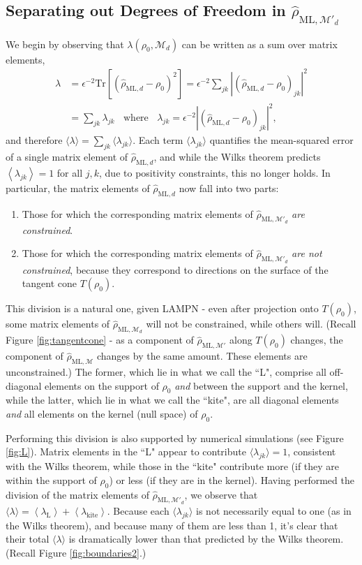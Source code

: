 \documentclass[aps,pra, twocolumn]{revtex4-1}
\newcommand{\M}{\mathcal{M}}
\newcommand{\expect}[1]{\ensuremath{\left\langle#1\right\rangle}}
\newcommand{\rhohat}{\hat{\rho}}
\newcommand{\rhoML}[1]{\rhohat_{\scriptscriptstyle{\mathrm{ML},#1}}}
\begin{document}
\subsection{Separating out Degrees of Freedom in $\rhoML{\M'_{d}}$}
\label{subsec:dof}
We begin by observing that $\lambda(\rho_{0}, \M_{d})$ can be written as a sum over matrix elements,
\begin{align}
\label{eq:llrserrors}
\nonumber \lambda &=\epsilon^{-2}\mathrm{Tr}[(\rhoML{d} - \rho_{0})^{2}] = \epsilon^{-2}\sum_{jk}|(\rhoML{d}- \rho_{0} )_{jk}|^{2}\\
&= \sum_{jk}\lambda_{jk}~~~~\text{where}~~~~\lambda_{jk} = \epsilon^{-2}|(\rhoML{d} - \rho_{0} )_{jk} |^{2},
\end{align}
and therefore $\langle \lambda \rangle = \sum_{jk}\langle\lambda_{jk}\rangle$.  Each term $\langle \lambda_{jk}\rangle$ quantifies the mean-squared error of a single matrix element of $\rhoML{d}$, and while the Wilks theorem predicts $\expect{\lambda_{jk}}=1$ for all $j,k$, due to positivity constraints, this no longer holds. In particular, the matrix elements of $\rhoML{d}$ now fall into two parts:

\begin{enumerate}[noitemsep]
\item Those for which the corresponding matrix elements of $\rhoML{\M'_{d}}$ \emph{are constrained}.
\item Those for which the corresponding matrix elements of $\rhoML{\M'_{d}}$ \emph{are not constrained}, because they correspond to directions on the surface of the tangent cone $T(\rho_{0})$.
\end{enumerate}
This division is a natural one, given LAMPN - even after projection onto $T(\rho_{0})$, some matrix elements of $\rhoML{\M_{d}}$ will not be constrained, while others will. (Recall Figure \ref{fig:tangentcone} - as a component of $\rhoML{\M'}$ along $T(\rho_{0})$ changes, the component of $\rhoML{\M}$ changes by the same amount. These elements are unconstrained.) The former, which lie in what we call the ``L", comprise all off-diagonal elements on the support of $\rho_0$ \emph{and} between the support and the kernel, while the latter, which lie in what we call the ``kite", are all diagonal elements \emph{and} all elements on the kernel (null space) of $\rho_0$.

Performing this division is also supported by numerical simulations (see Figure \ref{fig:L}). Matrix elements in the ``L" appear to contribute $\langle \lambda_{jk}\rangle = 1$, consistent with the Wilks theorem, while those in the ``kite" contribute more (if they are within the support of $\rho_{0}$) or less (if they are in the kernel).  Having performed the division of the matrix elements of $\rhoML{\M'_{d}}$, we observe that $\langle\lambda\rangle = \expect{\lambda_{\mathrm{L}}} + \expect{\lambda_{\mathrm{kite}}}$. Because each $\langle \lambda_{jk}\rangle$ is not necessarily equal to one (as in the Wilks theorem), and because many of them are less than 1, it's clear that their total $\langle \lambda \rangle$ is dramatically lower than that predicted by the Wilks theorem. (Recall Figure \ref{fig:boundaries2}.)
\end{document}

